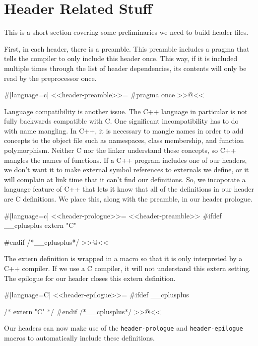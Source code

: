 \section{Header Related Stuff}

This is a short section covering some preliminaries we need to build header
files.

First, in each header, there is a preamble.  This preamble includes a pragma
that tells the compiler to only include this header once.  This way, if it is
included multiple times through the list of header dependencies, its contents
will only be read by the preprocessor once.

#[language=c]
<<header-preamble>>=
#pragma once
>>@<<

Language compatibility is another issue.  The C++ language in particular is not
fully backwards compatible with C.  One significant incompatibility has to do
with name mangling.  In C++, it is necessary to mangle names in order to add
concepts to the object file such as namespaces, class membership, and function
polymorphism.  Neither C nor the linker understand these concepts, so C++
mangles the names of functions.  If a C++ program includes one of our headers,
we don't want it to make external symbol references to externals we define, or
it will complain at link time that it can't find our definitions.  So, we
incoporate a language feature of C++ that lets it know that all of the
definitions in our header are C definitions.  We place this, along with the
preamble, in our header prologue.

#[language=c]
<<header-prologue>>=
<<header-preamble>>
#ifdef   __cplusplus
extern "C" {
#endif /*__cplusplus*/
>>@<<

The extern definition is wrapped in a macro so that it is only interpreted by a
C++ compiler.  If we use a C compiler, it will not understand this extern
setting.  The epilogue for our header closes this extern definition.

#[language=C]
<<header-epilogue>>=
#ifdef   __cplusplus
} /* extern "C" */
#endif /*__cplusplus*/
>>@<<

Our headers can now make use of the \verb/header-prologue/ and
\verb/header-epilogue/ macros to automatically include these definitions.
